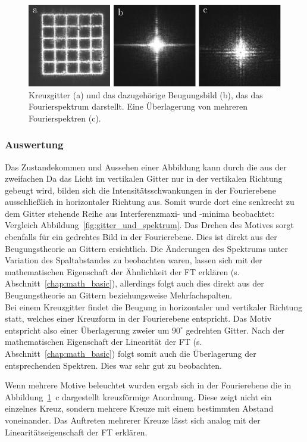 \begin{figure}[ht]
	\centering
	\includegraphics{images/Regina/abb14.pdf}
	\caption[Kreuzgitter mit Fourierspektrum]{
		Kreuzgitter (a) und das dazugehörige Beugungsbild (b), das das Fourierspektrum darstellt. Eine Überlagerung von mehreren Fourierspektren (c).
	}
	\label{fig:kreuzgitter_und_spektrum}
\end{figure}



\subsubsection*{Auswertung}
Das Zustandekommen und Aussehen einer Abbildung kann durch die aus der zweifachen 
Da das Licht im vertikalen Gitter nur in der vertikalen Richtung gebeugt wird, bilden sich die Intensitätsschwankungen in der Fourierebene ausschließlich in horizontaler Richtung aus. Somit wurde dort eine senkrecht zu dem Gitter stehende Reihe aus Interferenzmaxi- und -minima beobachtet: Vergleich Abbildung~\ref{fig:gitter_und_spektrum}. Das Drehen des Motives sorgt ebenfalls für ein gedrehtes Bild in der Fourierebene. Dies ist direkt aus der Beugungstheorie an Gittern ersichtlich. Die Änderungen des Spektrums unter Variation des Spaltabstandes zu beobachten waren, lassen sich mit der mathematischen Eigenschaft der Ähnlichkeit der FT erklären (s. Abschnitt~\ref{chap:math_basic}), allerdings folgt auch dies direkt aus der Beugungstheorie an Gittern beziehungsweise Mehrfachspalten.\\

Bei einem Kreuzgitter findet die Beugung in horizontaler und vertikaler Richtung statt, welches einer Kreuzform in der Fourierebene entspricht. Das Motiv entspricht also einer Überlagerung zweier um $90^\circ$ gedrehten Gitter. Nach der mathematischen Eigenschaft der Linearität der FT (s. Abschnitt~\ref{chap:math_basic}) folgt somit auch die Überlagerung der entsprechenden Spektren. Dies war sehr gut zu beobachten.

Wenn mehrere Motive beleuchtet wurden ergab sich in der Fourierebene die in Abbildung~\ref{fig:kreuzgitter_und_spektrum}~c dargestellt kreuzförmige Anordnung. Diese zeigt nicht ein einzelnes Kreuz, sondern mehrere Kreuze mit einem bestimmten Abstand voneinander. Das Auftreten mehrerer Kreuze lässt sich analog mit der Linearitätseigenschaft der FT erklären. 


